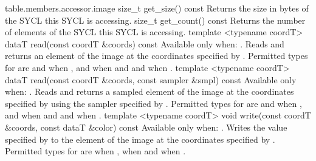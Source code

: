   {table.members.accessor.image}
  \addRow
    { size_t get_size() const }
    {
      Returns the size in bytes of the SYCL  this SYCL
       is accessing.
    }
  \addRow
    { size_t get_count() const }
    {
      Returns the number of elements of the SYCL  this SYCL  is accessing.
    }
  \addRowTwoSL
    { template <typename coordT> }
    { dataT read(const coordT \&coords) const }
    {
      Available only when: .
      \newline
      Reads and returns an element of the image at the coordinates specified by . Permitted types for  are  and  when ,  and  when  and  and  when .
    }
  \addRowTwoSL
    { template <typename coordT> }
    { dataT read(const coordT \&coords, const sampler \&smpl) const }
    {
      Available only when: .
      \newline
      Reads and returns a sampled element of the image at the coordinates
      specified by  using the sampler specified by
      . Permitted types for  are
       and  when ,  and  when  and  and  when
      .
    }
  \addRowTwoSL
    { template <typename coordT> }    
    { void write(const coordT \&coords, const dataT \&color) const }
    {
      Available only when: .
      \newline
      Writes the value specified by  to the element of the
      image at the coordinates specified by . Permitted types
      for  are  when ,  when 
      and  when .
    }
